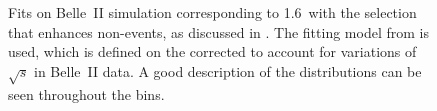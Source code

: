 \begin{figure}[htbp!]
{    }
    \caption{\label{fig:mbc_bbar_ehnhanced_fits_mc}
    Fits on Belle~II simulation corresponding to 1.6~\invab with the selection 
    that enhances non-\BtoXsgamma events, as discussed in .
    The fitting model from  is used,
    which is defined on the corrected \Mbc to account for variations of $\sqrt{s}$ in Belle~II data.
    A good description of the \Mbc distributions can be seen throughout the \EB bins.
    }
\end{figure}
